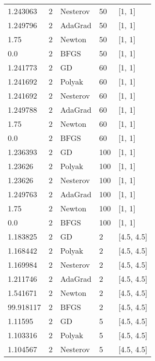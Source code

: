 \begin{tabular}{lllll}
  1.243063 &        2 & Nesterov &     50 &           [1, 1] \\
  1.249796 &        2 &  AdaGrad &     50 &           [1, 1] \\
      1.75 &        2 &   Newton &     50 &           [1, 1] \\
       0.0 &        2 &     BFGS &     50 &           [1, 1] \\
  1.241773 &        2 &       GD &     60 &           [1, 1] \\
  1.241692 &        2 &   Polyak &     60 &           [1, 1] \\
  1.241692 &        2 & Nesterov &     60 &           [1, 1] \\
  1.249788 &        2 &  AdaGrad &     60 &           [1, 1] \\
      1.75 &        2 &   Newton &     60 &           [1, 1] \\
       0.0 &        2 &     BFGS &     60 &           [1, 1] \\
  1.236393 &        2 &       GD &    100 &           [1, 1] \\
   1.23626 &        2 &   Polyak &    100 &           [1, 1] \\
   1.23626 &        2 & Nesterov &    100 &           [1, 1] \\
  1.249763 &        2 &  AdaGrad &    100 &           [1, 1] \\
      1.75 &        2 &   Newton &    100 &           [1, 1] \\
       0.0 &        2 &     BFGS &    100 &           [1, 1] \\
  1.183825 &        2 &       GD &      2 &       [4.5, 4.5] \\
  1.168442 &        2 &   Polyak &      2 &       [4.5, 4.5] \\
  1.169984 &        2 & Nesterov &      2 &       [4.5, 4.5] \\
  1.211746 &        2 &  AdaGrad &      2 &       [4.5, 4.5] \\
  1.541671 &        2 &   Newton &      2 &       [4.5, 4.5] \\
 99.918117 &        2 &     BFGS &      2 &       [4.5, 4.5] \\
   1.11595 &        2 &       GD &      5 &       [4.5, 4.5] \\
  1.103316 &        2 &   Polyak &      5 &       [4.5, 4.5] \\
  1.104567 &        2 & Nesterov &      5 &       [4.5, 4.5] \\

\end{tabular}
